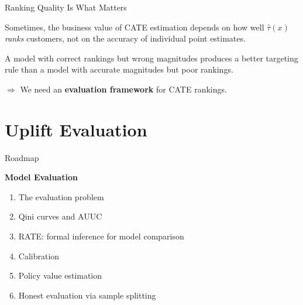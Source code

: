 \documentclass[aspectratio=169, 11pt]{beamer}
\begin{document}
\begin{frame}{Ranking Quality Is What Matters}
 
Sometimes, the business value of CATE estimation depends on how well $\hat{\tau}(x)$ \emph{ranks} customers, not on the accuracy of individual point estimates.
 
\bigskip
 
A model with correct rankings but wrong magnitudes produces a better targeting rule than a model with accurate magnitudes but poor rankings.
 
\bigskip
 
$\Rightarrow$ We need an \textbf{evaluation framework} for CATE rankings.
 
\end{frame}

 
\section{Uplift Evaluation}
 
\begin{frame}{Roadmap}
 
\textbf{Model Evaluation} 
\begin{enumerate}
    \item The evaluation problem
    \item Qini curves and AUUC
    \item RATE: formal inference for model comparison
    \item Calibration
    \item Policy value estimation
    \item Honest evaluation via sample splitting
\end{enumerate}

\end{frame}
 
\end{document}
